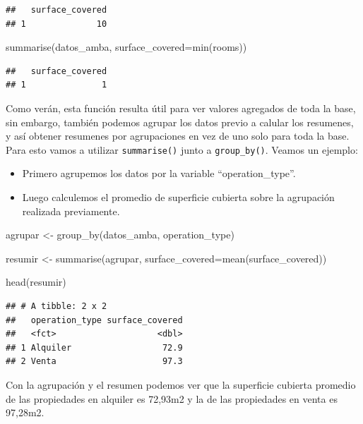 \documentclass[
  spanish,
]{book}
\newenvironment{Shaded}{\begin{snugshade}}{\end{snugshade}}
\newcommand{\AttributeTok}[1]{\textcolor[rgb]{0.77,0.63,0.00}{#1}}
\newcommand{\FunctionTok}[1]{\textcolor[rgb]{0.00,0.00,0.00}{#1}}
\newcommand{\NormalTok}[1]{#1}
\newcommand{\OtherTok}[1]{\textcolor[rgb]{0.56,0.35,0.01}{#1}}
\begin{document}
\begin{verbatim}
##   surface_covered
## 1              10
\end{verbatim}

\begin{Shaded}
\begin{Highlighting}[]
\FunctionTok{summarise}\NormalTok{(datos\_amba, }\AttributeTok{surface\_covered=}\FunctionTok{min}\NormalTok{(rooms))}
\end{Highlighting}
\end{Shaded}

\begin{verbatim}
##   surface_covered
## 1               1
\end{verbatim}

Como verán, esta función resulta útil para ver valores agregados de toda la base, sin embargo, también podemos agrupar los datos previo a calular los resumenes, y así obtener resumenes por agrupaciones en vez de uno solo para toda la base. Para esto vamos a utilizar \texttt{summarise()} junto a \texttt{group\_by()}. Veamos un ejemplo:

\begin{itemize}
\item
  Primero agrupemos los datos por la variable ``operation\_type''.
\item
  Luego calculemos el promedio de superficie cubierta sobre la agrupación realizada previamente.
\end{itemize}

\begin{Shaded}
\begin{Highlighting}[]
\NormalTok{agrupar }\OtherTok{\textless{}{-}} \FunctionTok{group\_by}\NormalTok{(datos\_amba, operation\_type)}

\NormalTok{resumir }\OtherTok{\textless{}{-}} \FunctionTok{summarise}\NormalTok{(agrupar, }\AttributeTok{surface\_covered=}\FunctionTok{mean}\NormalTok{(surface\_covered))}

\FunctionTok{head}\NormalTok{(resumir)}
\end{Highlighting}
\end{Shaded}

\begin{verbatim}
## # A tibble: 2 x 2
##   operation_type surface_covered
##   <fct>                    <dbl>
## 1 Alquiler                  72.9
## 2 Venta                     97.3
\end{verbatim}

Con la agrupación y el resumen podemos ver que la superficie cubierta promedio de las propiedades en alquiler es 72,93m2 y la de las propiedades en venta es 97,28m2.
\end{document}
